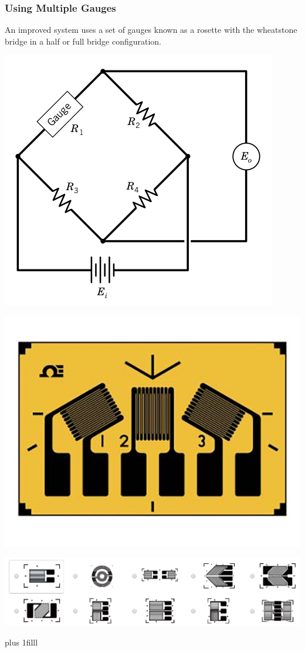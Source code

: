\documentclass[fleqn]{beamer} %
\newcommand{\sectionIIsubsectionIItitle}{Using Multiple Gauges}
\newcommand{\btVFill}{\vskip0pt plus 1filll}
\begin{document}
			\begin{frame}
				\frametitle{\sectionIIsubsectionIItitle} \scriptsize
				\bigskip

				An improved system uses a set of gauges known as a {\PN rosette} with the wheatstone bridge in a half or full bridge configuration. \vspc

\begin{multicols}{2}
\includegraphics[scale=.2]{images/bridge_circuit_fig2.png}

\includegraphics[scale=.2]{images/delta_rosette.jpg}
\end{multicols}
\includegraphics[scale=.4]{images/gauge_geometries.png}			


				
				\btVFill
				

			\end{frame}
\end{document}
